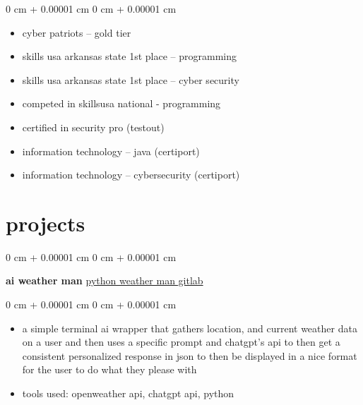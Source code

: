 \documentclass[10pt, letterpaper]{article}
\newenvironment{highlights}{
    \begin{itemize}[
        topsep=0.10 cm,
        parsep=0.10 cm,
        partopsep=0pt,
        itemsep=0pt,
        leftmargin=0 cm + 10pt
    ]
}{
    \end{itemize}
} %
\newenvironment{onecolentry}{
    \begin{adjustwidth}{
        0 cm + 0.00001 cm
    }{
        0 cm + 0.00001 cm
    }
}{
    \end{adjustwidth}
} %
\newenvironment{twocolentry}[2][]{
    \onecolentry
    \def\secondcolumn{#2}
    \setcolumnwidth{\fill, 4.5 cm}
    \begin{paracol}{2}
}{
    \switchcolumn \raggedleft \secondcolumn
    \end{paracol}
    \endonecolentry
} %
\begin{document}
        \vspace{0.10 cm}
        \begin{onecolentry}
            \begin{highlights}
                \item cyber patriots – gold tier
                \item skills usa arkansas state 1st place – programming
                \item skills usa arkansas state 1st place – cyber security
                \item competed in skillsusa national - programming 
                \item certified in security pro (testout)
                \item information technology – java (certiport)
                \item information technology – cybersecurity (certiport)
            \end{highlights}
        \end{onecolentry}





     
    
    \section{projects}

        \begin{twocolentry}{
            \href{https://gitlab.com/paradigms1/pythonaiwetherman}{python weather man gitlab}
        }
            \textbf{ai weather man}\end{twocolentry}

        \vspace{0.10 cm}
        \begin{onecolentry}
            \begin{highlights}
                \item a simple terminal ai wrapper that gathers location, and current weather data on a user and then uses a specific prompt and chatgpt's api to then get a consistent personalized response in json to then be displayed in a nice format for the user to do what they please with
                \item tools used: openweather api, chatgpt api, python 
            \end{highlights}
        \end{onecolentry}
\end{document}
